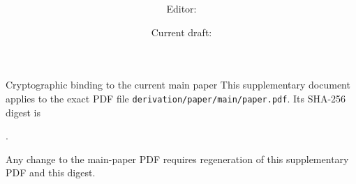 \documentclass[11pt]{article}
\title{\CNNAMainTitle\\\large \CNNASupplementSubtitle}
\author{Editor: \CNNAEditor}
\date{Current draft: \CNNADocumentDate}
\begin{document}
\maketitle
\begin{cnnaInfoBox}{Cryptographic binding to the current main paper}
This supplementary document applies to the exact PDF file
\texttt{derivation/paper/main/paper.pdf}. Its SHA-256 digest is
\par\smallskip
{\ttfamily\small\seqsplit{\CNNAMainPaperSHA}}.
\par\smallskip
Any change to the main-paper PDF requires regeneration of this supplementary PDF and this digest.
\end{cnnaInfoBox}

\end{document}
